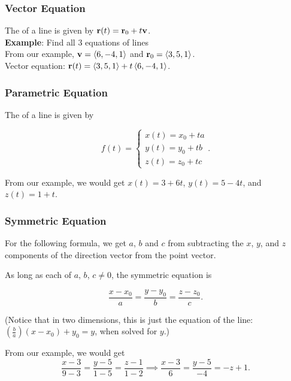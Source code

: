 \subsubsection{Vector Equation}

The  of a line is given by \(\mathbf{r}(t) = \mathbf{r}_{0} + t \mathbf{v}\). \\

\textbf{Example}: Find all 3 equations of lines  \\

From our example, \(\mathbf{v} = \left\langle 6,-4,1 \right\rangle\) and \(\mathbf{r}_{0} = \left\langle 3,5,1 \right\rangle\). \\

Vector equation: \(\mathbf{r}(t) = \left\langle 3,5,1 \right\rangle + t\left\langle 6,-4,1 \right\rangle\).

\subsubsection{Parametric Equation}

The  of a line is given by

\[
    f(t) = \begin{cases}
        x(t) = x_{0} + ta \\
        y(t) = y_{0} + tb \\
        z(t) = z_{0} + tc
    \end{cases}.
\]

From our example, we would get \(x(t) = 3 + 6t\), \(y(t) = 5 - 4t\), and \(z(t) = 1 + t\).

\subsubsection{Symmetric Equation}

For the following formula, we get \(a\), \(b\) and \(c\) from subtracting the \(x\), \(y\), and \(z\) components of the direction vector from the point vector.

As long as each of \(a\), \(b\), \(c \neq 0\), the symmetric equation is

\[
    \frac{x - x_{0}}{a} = \frac{y - y_{0}}{b} = \frac{z - z_{0}}{c}.
\]

(Notice that in two dimensions, this is just the equation of the line: \((\frac{b}{a})(x - x_{0}) + y_{0} = y\), when solved for \(y\).)

From our example, we would get
\[
\frac{x - 3}{9 - 3} = \frac{y - 5}{1 - 5} = \frac{z - 1}{1 - 2} \implies \frac{x - 3}{6} = \frac{y - 5}{-4} = -z + 1.
\]

